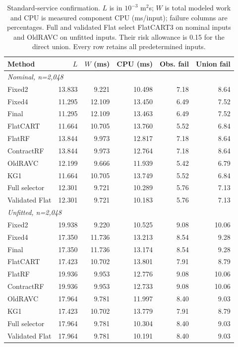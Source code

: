 \begin{table}[!htbp]\centering\small
\caption{Standard-service confirmation. $L$ is in $10^{-3}$ m$^2$s; $W$ is total modeled work and CPU is measured component CPU (ms/input); failure columns are percentages. Full and validated Flat select FlatCART3 on nominal inputs and OldRAVC on unfitted inputs. Their risk allowance is 0.15 for the direct union. Every row retains all predetermined inputs.}\label{tab:r8-standard}
\begin{tabular}{@{}lrrrrr@{}}\toprule
Method & $L$ & $W$ (ms) & CPU (ms) & Obs. fail & Union fail\\\midrule
\multicolumn{6}{l}{\textit{Nominal, n=2,048}}\\
Fixed2 & 13.833 & 9.221 & 10.498 & 7.18 & 8.64\\
Fixed4 & 11.295 & 12.109 & 13.450 & 6.49 & 7.52\\
Final & 11.295 & 12.109 & 13.463 & 6.49 & 7.52\\
FlatCART & 11.664 & 10.705 & 13.760 & 5.52 & 6.84\\
FlatRF & 13.844 & 9.973 & 12.817 & 7.18 & 8.64\\
ContractRF & 13.844 & 9.973 & 12.764 & 7.18 & 8.64\\
OldRAVC & 12.199 & 9.666 & 11.939 & 5.42 & 6.79\\
KG1 & 11.664 & 10.705 & 13.749 & 5.52 & 6.84\\
Full selector & 12.301 & 9.721 & 10.289 & 5.76 & 7.13\\
Validated Flat & 12.301 & 9.721 & 10.183 & 5.76 & 7.13\\
\multicolumn{6}{l}{\textit{Unfitted, n=2,048}}\\
Fixed2 & 19.938 & 9.220 & 10.525 & 9.08 & 10.06\\
Fixed4 & 17.350 & 11.736 & 13.213 & 8.54 & 9.28\\
Final & 17.350 & 11.736 & 13.174 & 8.54 & 9.28\\
FlatCART & 17.423 & 10.702 & 13.801 & 7.91 & 8.79\\
FlatRF & 19.936 & 9.953 & 12.776 & 9.08 & 10.06\\
ContractRF & 19.936 & 9.953 & 12.733 & 9.08 & 10.06\\
OldRAVC & 17.964 & 9.781 & 11.997 & 8.40 & 9.03\\
KG1 & 17.423 & 10.702 & 13.779 & 7.91 & 8.79\\
Full selector & 17.964 & 9.781 & 10.304 & 8.40 & 9.03\\
Validated Flat & 17.964 & 9.781 & 10.191 & 8.40 & 9.03\\
\bottomrule\end{tabular}\end{table}
